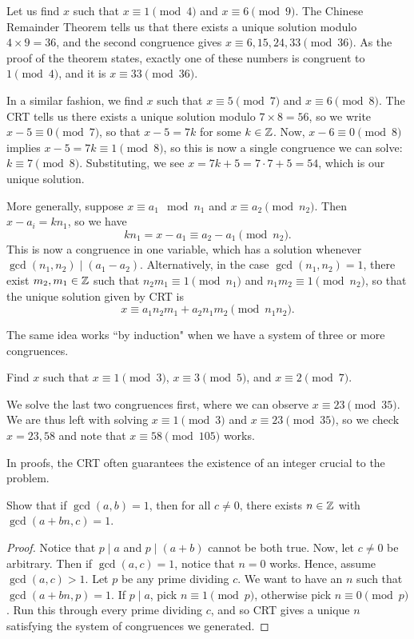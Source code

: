 \documentclass{article}
\begin{document}
\begin{example}
Let us find $x$ such that $x\equiv 1\pmod 4$ and $x\equiv 6\pmod 9$. The Chinese Remainder Theorem tells us that there exists a unique solution modulo $4\times 9 = 36$, and the second congruence gives $x\equiv 6, 15, 24, 33\pmod{36}$. As the proof of the theorem states, exactly one of these numbers is congruent to $1\pmod 4$, and it is $x\equiv \boxed{33}\pmod{36}$.
\end{example}

\begin{example}
In a similar fashion, we find $x$ such that $x\equiv 5\pmod 7$ and $x\equiv 6\pmod 8$. The CRT tells us there exists a unique solution modulo $7\times 8 = 56$, so we write $x-5\equiv 0\pmod 7$, so that $x-5 = 7k$ for some $k\in \mathbb Z$. Now, $x-6\equiv 0\pmod 8$ implies $x-5 = 7k\equiv 1\pmod 8$, so this is now a single congruence we can solve: $k\equiv 7\pmod 8$. Substituting, we see $x = 7k+5 = 7\cdot 7+5 = \boxed{54}$, which is our unique solution.
\end{example}

More generally, suppose $x\equiv a_1\mod{n_1}$ and $x\equiv a_2\pmod{n_2}$. Then $x - a_i = kn_1$, so we have
$$kn_1 = x-a_1 \equiv a_2 - a_1\pmod{n_2}.$$
This is now a congruence in one variable, which has a solution whenever $\gcd(n_1, n_2) \mid (a_1 - a_2)$. Alternatively, in the case $\gcd(n_1, n_2) = 1$, there exist $m_2, m_1\in\mathbb Z$ such that $n_2m_1\equiv 1\pmod{n_1}$ and $n_1m_2\equiv 1\pmod{n_2}$, so that the unique solution given by CRT is
$$x\equiv a_1n_2m_1 + a_2n_1m_2 \pmod{n_1n_2}.$$

The same idea works ``by induction" when we have a system of three or more congruences.
\begin{example}
Find $x$ such that $x\equiv 1\pmod 3$, $x\equiv 3\pmod 5$, and $x\equiv 2\pmod 7$.
\end{example}
\begin{solution}
We solve the last two congruences first, where we can observe $x\equiv 23\pmod{35}$. We are thus left with solving $x\equiv 1\pmod 3$ and $x\equiv 23\pmod{35}$, so we check $x = 23, 58$ and note that $x\equiv \boxed{58} \pmod{105}$ works.
\end{solution}

In proofs, the CRT often guarantees the existence of an integer crucial to the problem.
\begin{example}
Show that if $\gcd(a,b) = 1$, then for all $c\neq 0$, there exists $n\in\mathbb Z$ with $\gcd(a+bn, c) = 1$.
\end{example}
\begin{proof}
Notice that $p\mid a$ and $p\mid (a+b)$ cannot be both true. Now, let $c\neq 0$ be arbitrary. Then if $\gcd(a, c) = 1$, notice that $n=0$ works. Hence, assume $\gcd(a,c) > 1$. Let $p$ be any prime dividing $c$. We want to have an $n$ such that $\gcd(a+bn, p) = 1$. If $p\mid a$, pick $n\equiv 1\pmod p$, otherwise pick $n\equiv 0\pmod p$. Run this through every prime dividing $c$, and so CRT gives a unique $n$ satisfying the system of congruences we generated.
\end{proof}
\end{document}
